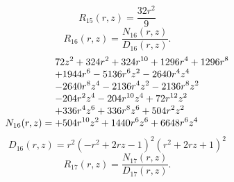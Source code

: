 \documentclass[11pt,a4paper]{article}
\begin{document}
\begin{equation}
R_{15}(r,z)=\frac{32 r^{2}}{9}
\label{eq:cat-rational-15}
\end{equation}
\begin{equation}
R_{16}(r,z)=\frac{N_{16}(r,z)}{D_{16}(r,z)}.
\label{eq:cat-rational-16}
\end{equation}
\begin{equation}
N_{16}(r,z)=\shortstack[l]{$\displaystyle 72 z^{2} + 324 r^{2} + 324 r^{10} + 1296 r^{4} + 1296 r^{8}$\\
$\displaystyle  + 1944 r^{6} - 5136 r^{6} z^{2} - 2640 r^{4} z^{4}$\\
$\displaystyle  - 2640 r^{8} z^{4} - 2136 r^{4} z^{2} - 2136 r^{8} z^{2}$\\
$\displaystyle  - 204 r^{2} z^{4} - 204 r^{10} z^{4} + 72 r^{12} z^{2}$\\
$\displaystyle  + 336 r^{4} z^{6} + 336 r^{8} z^{6} + 504 r^{2} z^{2}$\\
$\displaystyle  + 504 r^{10} z^{2} + 1440 r^{6} z^{6} + 6648 r^{6} z^{4}$}
\label{eq:cat-numerator-16}
\end{equation}
\begin{equation}
D_{16}(r,z)=r^{2} \left(- r^{2} + 2 r z - 1\right)^{2} \left(r^{2} + 2 r z + 1\right)^{2}
\label{eq:cat-denominator-16}
\end{equation}
\begin{equation}
R_{17}(r,z)=\frac{N_{17}(r,z)}{D_{17}(r,z)}.
\label{eq:cat-rational-17}
\end{equation}
\end{document}
